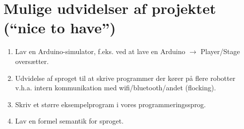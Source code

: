 \documentclass[a4paper,oneside, draft]{memoir}
\begin{document}
\section{Mulige udvidelser af projektet ("`nice to have"')}
\begin{enumerate}

\item Lav en Arduino-simulator, f.eks. ved at lave en Arduino $\rightarrow$
  Player/Stage oversætter.

\item Udvidelse af sproget til at skrive programmer der kører på flere robotter
  v.h.a. intern kommunikation med wifi/bluetooth/andet (flocking).

\item Skriv et større eksempelprogram i vores programmeringssprog.

\item Lav en formel semantik for sproget.

\end{enumerate}






\end{document}
